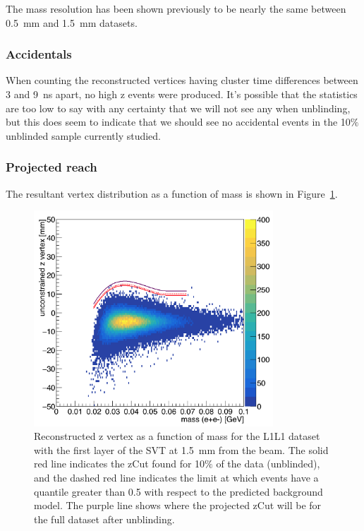 \documentclass[twoside]{article}
\begin{document}
The mass resolution has been shown previously to be nearly the same between 0.5~mm and 1.5~mm datasets. 

\subsubsection{Accidentals}

When counting the reconstructed vertices having cluster time differences between 3 and 9~ns apart, no high z events were produced. It's possible that the statistics are too low to say with any certainty that we will not see any when unblinding, but this does seem to indicate that we should see no accidental events in the 10$\%$ unblinded sample currently studied.

\subsubsection{Projected reach}

The resultant vertex distribution as a function of mass is shown in Figure~\ref{fig:zVm_L1L1_1p5}. 

\begin{figure}[H]
  \centering
     \includegraphics[width=0.8\textwidth]{plots/zVm_L1L1_1p5.png}
  \caption{Reconstructed z vertex as a function of mass for the L1L1 dataset with the first layer of the SVT at 1.5~mm from the beam. The solid red line indicates the zCut found for 10$\%$ of the data (unblinded), and the dashed red line indicates the limit at which events have a quantile greater than 0.5 with respect to the predicted background model. The purple line shows where the projected zCut will be for the full dataset after unblinding.}
  \label{fig:zVm_L1L1_1p5}
\end{figure} 
\end{document}
